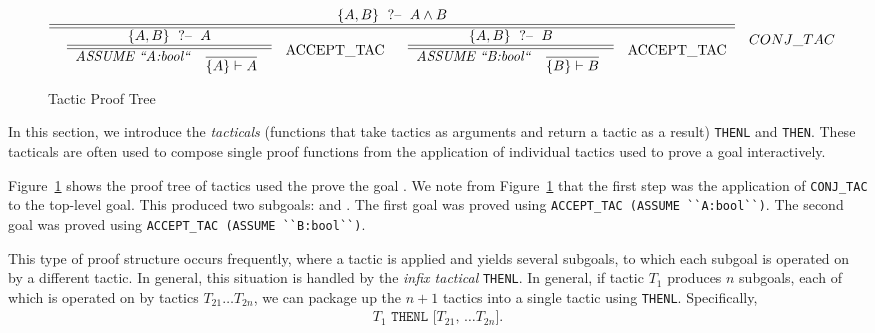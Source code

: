 \begin{figure}[t]
  \centering
      \begin{minipage}{0.92\linewidth}
        \begin{tiny}
          \begin{gather*}
            \tac {\goal{A,B}{A \wedge B}} { \tac {\goal{A,B}{A}}
              {\irule {} {\seq{A}{A}} {ASSUME ``A:bool``} }
              {ACCEPT\_TAC} \quad \tac {\goal{A,B}{B}} {\irule {}
                {\seq{B}{B}} {ASSUME ``B:bool``} } {ACCEPT\_TAC}}
            {CONJ\_TAC}
          \end{gather*}
        \end{tiny}
      \end{minipage}
  \caption{Tactic Proof Tree}
\label{fig:tactic-proof-tree}
\end{figure}

In this section, we introduce the \emph{tacticals} (functions that
take tactics as arguments and return a tactic as a result)
\texttt{THENL} and \texttt{THEN}.  These tacticals are often used to
compose single proof functions from the application of individual
tactics used to prove a goal interactively.

Figure~\ref{fig:tactic-proof-tree} shows the proof tree of tactics
used the prove the goal . We note from
Figure~\ref{fig:tactic-proof-tree} that the first step was the
application of \verb|CONJ_TAC| to the top-level goal.  This produced
two subgoals:  and . The first goal was
proved using \verb|ACCEPT_TAC (ASSUME ``A:bool``)|. The second goal
was proved using \verb|ACCEPT_TAC (ASSUME ``B:bool``)|.

This type of proof structure occurs frequently, where a tactic is applied and yields
several subgoals, to which each subgoal is operated on by a different
tactic.  In general, this situation is handled by the \emph{infix
  tactical} \texttt{THENL}.  In general, if tactic $T_1$ produces $n$
subgoals, each of which is operated on by tactics $T_{21} \ldots
T_{2n}$, we can package up the $n+1$ tactics into a single tactic
using \texttt{THENL}.  Specifically,
\begin{gather*}
  \texttt{$T_1$ THENL [$T_{21}$, \ldots $T_{2n}$]}.
\end{gather*}

